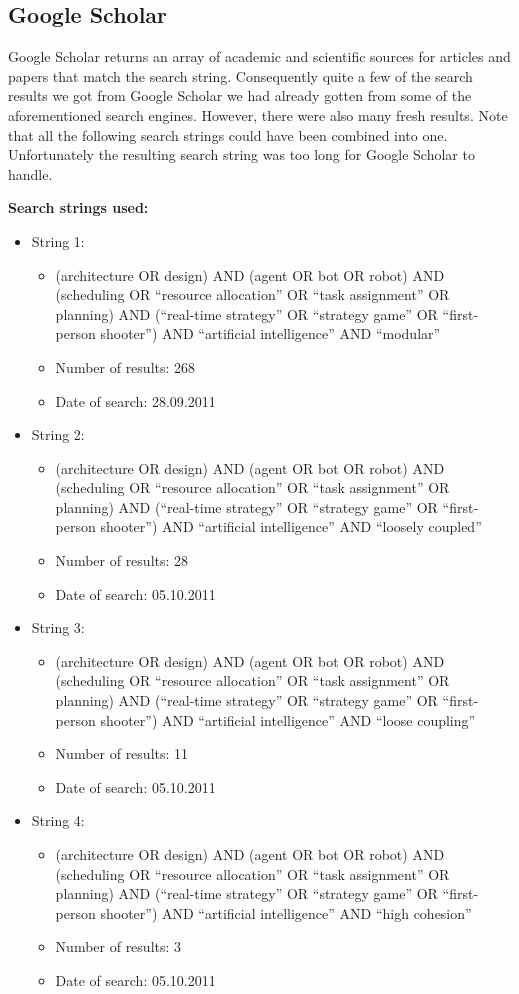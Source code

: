 \subsection{Google Scholar}
\label{sub:google_scholar}
Google Scholar returns an array of academic and scientific sources for articles and papers that match the search string. Consequently quite a few of the search results we got from Google Scholar we had already gotten from some of the aforementioned search engines. However, there were also many fresh results. Note that all the following search strings could have been combined into one. Unfortunately the resulting search string was too long for Google Scholar to handle.

\textbf{Search strings used:}
\begin{itemize}
\item String 1:
\begin{itemize}
\item (architecture OR design) AND (agent OR bot OR robot) AND (scheduling OR ``resource allocation'' OR ``task assignment'' OR planning) AND (``real-time strategy'' OR ``strategy game'' OR ``first-person shooter'') AND ``artificial intelligence'' AND ``modular''
\item Number of results: 268
\item Date of search: 28.09.2011
\end{itemize}
\item String 2:
\begin{itemize}
\item (architecture OR design) AND (agent OR bot OR robot) AND (scheduling OR ``resource allocation'' OR ``task assignment'' OR planning) AND (``real-time strategy'' OR ``strategy game'' OR ``first-person shooter'') AND ``artificial intelligence'' AND ``loosely coupled''
\item Number of results: 28
\item Date of search: 05.10.2011
\end{itemize}
\item String 3:
\begin{itemize}
\item (architecture OR design) AND (agent OR bot OR robot) AND (scheduling OR ``resource allocation'' OR ``task assignment'' OR planning) AND (``real-time strategy'' OR ``strategy game'' OR ``first-person shooter'') AND ``artificial intelligence'' AND ``loose coupling''
\item Number of results: 11
\item Date of search: 05.10.2011
\end{itemize}
\item String 4:
\begin{itemize}
\item (architecture OR design) AND (agent OR bot OR robot) AND (scheduling OR ``resource allocation'' OR ``task assignment''  OR planning) AND (``real-time strategy'' OR ``strategy game'' OR ``first-person shooter'') AND ``artificial intelligence'' AND ``high cohesion''
\item Number of results: 3
\item Date of search: 05.10.2011
\end{itemize}
\end{itemize}